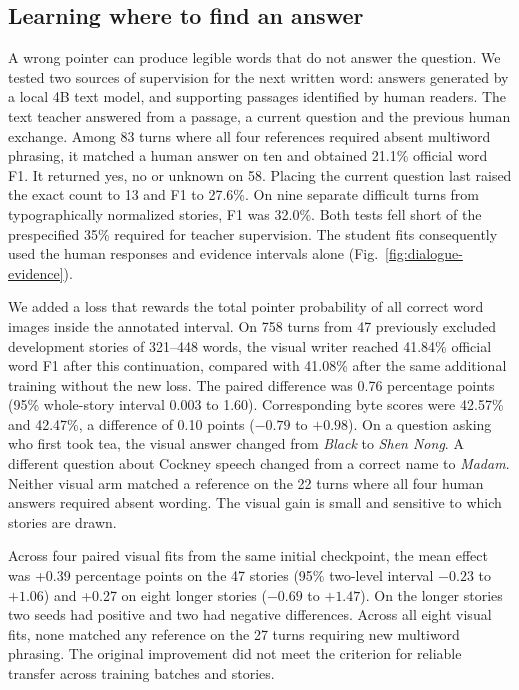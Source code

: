 \subsection*{Learning where to find an answer}
A wrong pointer can produce legible words that do not answer the question. We tested two sources of supervision for the next written word: answers generated by a local 4B text model, and supporting passages identified by human readers. The text teacher answered from a passage, a current question and the previous human exchange. Among 83 turns where all four references required absent multiword phrasing, it matched a human answer on ten and obtained 21.1\% official word F1. It returned yes, no or unknown on 58. Placing the current question last raised the exact count to 13 and F1 to 27.6\%. On nine separate difficult turns from typographically normalized stories, F1 was 32.0\%. Both tests fell short of the prespecified 35\% required for teacher supervision. The student fits consequently used the human responses and evidence intervals alone (Fig.~\ref{fig:dialogue-evidence}).

We added a loss that rewards the total pointer probability of all correct word images inside the annotated interval. On 758 turns from 47 previously excluded development stories of 321--448 words, the visual writer reached 41.84\% official word F1 after this continuation, compared with 41.08\% after the same additional training without the new loss. The paired difference was 0.76 percentage points (95\% whole-story interval 0.003 to 1.60). Corresponding byte scores were 42.57\% and 42.47\%, a difference of 0.10 points ($-0.79$ to $+0.98$). On a question asking who first took tea, the visual answer changed from \emph{Black} to \emph{Shen Nong}. A different question about Cockney speech changed from a correct name to \emph{Madam}. Neither visual arm matched a reference on the 22 turns where all four human answers required absent wording. The visual gain is small and sensitive to which stories are drawn.

Across four paired visual fits from the same initial checkpoint, the mean effect was +0.39 percentage points on the 47 stories (95\% two-level interval $-0.23$ to $+1.06$) and +0.27 on eight longer stories ($-0.69$ to $+1.47$). On the longer stories two seeds had positive and two had negative differences. Across all eight visual fits, none matched any reference on the 27 turns requiring new multiword phrasing. The original improvement did not meet the criterion for reliable transfer across training batches and stories.

